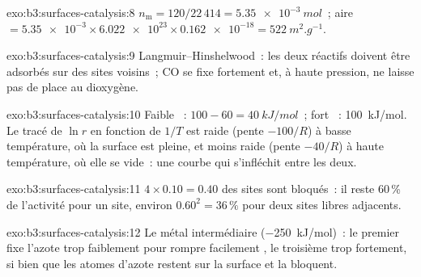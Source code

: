 \begin{solution}{exo:b3:surfaces-catalysis:8}
$n_{\mathrm m} = 120/22\,414 = \qty{5.35e-3}{mol}$~; aire $= \num{5.35e-3} \times \num{6.022e23} \times \num{0.162e-18} =
\qty{522}{m^2.g^{-1}}$.
\end{solution}

\begin{solution}{exo:b3:surfaces-catalysis:9}
Langmuir--Hinshelwood~: les deux réactifs doivent être adsorbés sur des
sites voisins~; CO se fixe fortement et, à haute pression, ne laisse pas
de place au dioxygène.
\end{solution}

\begin{solution}{exo:b3:surfaces-catalysis:10}
Faible ~: $100 - 60 = \qty{40}{kJ/mol}$~; fort ~: \qty{100}{kJ/mol}. Le tracé de $\ln r$
en fonction de $1/T$ est raide (pente $-100/R$) à basse température, où
la surface est pleine, et moins raide (pente $-40/R$) à haute
température, où elle se vide~: une courbe qui s'infléchit entre les
deux.
\end{solution}

\begin{solution}{exo:b3:surfaces-catalysis:11}
$4 \times 0.10 = 0.40$ des sites sont bloqués~: il reste 60\,\% de
l'activité pour un site, environ $0.60^2 = 36\,\%$ pour deux sites libres
adjacents.
\end{solution}

\begin{solution}{exo:b3:surfaces-catalysis:12}
Le métal intermédiaire (\qty{-250}{kJ/mol})~: le premier fixe l'azote
trop faiblement pour rompre facilement , le troisième trop
fortement, si bien que les atomes d'azote restent sur la surface et la
bloquent.
\end{solution}


